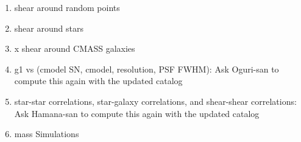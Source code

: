 \begin{enumerate}
    \item shear around random points
    \item shear around stars
    \item x shear around CMASS galaxies
    \item g1 vs (cmodel SN, cmodel, resolution, PSF FWHM): Ask Oguri-san to compute this again with the updated catalog
    \item star-star correlations, star-galaxy correlations, and shear-shear correlations: Ask Hamana-san to compute this again with the updated catalog
    \item mass Simulations
\end{enumerate}
